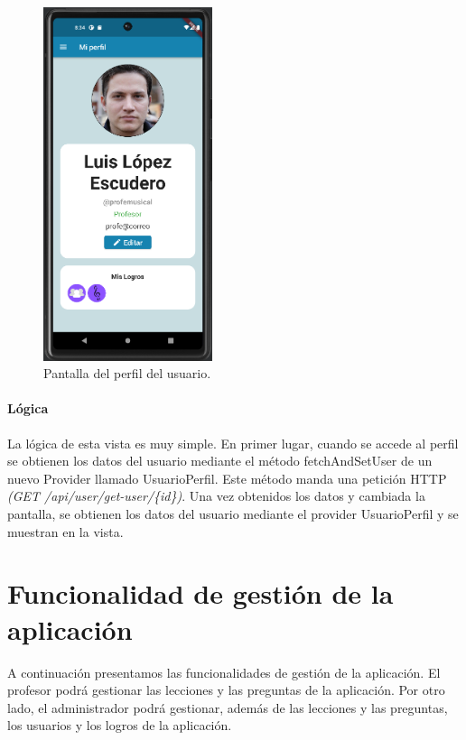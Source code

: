 \begin{figure}[H]
  \centering
  \includegraphics[width=0.44\textwidth]{imagenes/c7/miperfil.png}
  \caption{Pantalla del perfil del usuario.}
  \label{fig:login}
\end{figure}


\paragraph*{Lógica}
\label{sec:logica}
La lógica de esta vista es muy simple. En primer lugar, cuando se accede al perfil se obtienen los datos del usuario mediante el método fetchAndSetUser de un nuevo Provider llamado UsuarioPerfil. Este método
manda una petición HTTP \textit{(GET /api/user/get-user/\{id\})}. Una vez obtenidos los datos y cambiada la pantalla, se obtienen los datos del usuario mediante el provider UsuarioPerfil y se muestran en la vista. 

\section{Funcionalidad de gestión de la aplicación}
A continuación presentamos las funcionalidades de gestión de la aplicación. 
El profesor podrá gestionar las lecciones y las preguntas de la aplicación. 
Por otro lado, el administrador podrá gestionar, además de las lecciones y las preguntas, los usuarios y los logros de la aplicación.


